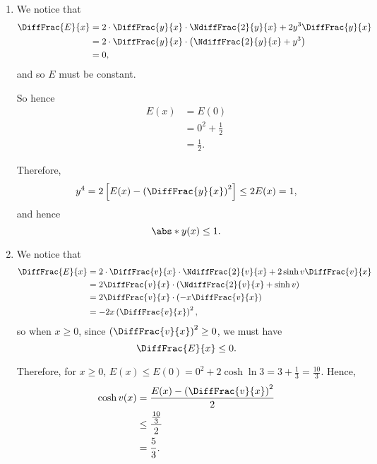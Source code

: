 \Question{\currfilebase}

\begin{enumerate}
    \item We notice that
          \begin{align*}
              \DiffFrac{E}{x} & = 2 \cdot \DiffFrac{y}{x} \cdot \NdiffFrac{2}{y}{x} + 2 y^3 \DiffFrac{y}{x} \\
                              & = 2 \cdot \DiffFrac{y}{x} \cdot \left(\NdiffFrac{2}{y}{x} + y^3\right)      \\
                              & = 0,
          \end{align*}
          and so \(E\) must be constant.

          So hence
          \begin{align*}
              E(x) & = E(0)              \\
                   & = 0^2 + \frac{1}{2} \\
                   & = \frac{1}{2}.
          \end{align*}

          Therefore,
          \[
              y^4 = 2\left[E(x) - \left(\DiffFrac{y}{x}\right)^2\right] \leq 2 E(x) = 1,
          \]
          and hence
          \[
              \abs*{y(x)} \leq 1.
          \]

    \item We notice that
          \begin{align*}
              \DiffFrac{E}{x} & = 2 \cdot \DiffFrac{v}{x} \cdot \NdiffFrac{2}{v}{x} + 2 \sinh v \DiffFrac{v}{x} \\
                              & = 2 \DiffFrac{v}{x} \cdot \left(\NdiffFrac{2}{v}{x} + \sinh v\right)            \\
                              & = 2 \DiffFrac{v}{x} \cdot \left(-x \DiffFrac{v}{x}\right)                       \\
                              & = -2x \left(\DiffFrac{v}{x}\right)^2,
          \end{align*}
          so when \(x \geq 0\), since \(\left(\DiffFrac{v}{x}\right)^2 \geq 0\), we must have
          \[
              \DiffFrac{E}{x} \leq 0.
          \]

          Therefore, for \(x \geq 0\), \(E(x) \leq E(0) = 0^2 + 2 \cosh \ln 3 = 3 + \frac{1}{3} = \frac{10}{3}\). Hence,
          \begin{align*}
              \cosh v(x) & = \frac{E(x) - \left(\DiffFrac{v}{x}\right)^2}{2} \\
                         & \leq \frac{\frac{10}{3}}{2}                       \\
                         & = \frac{5}{3}.
          \end{align*}


\end{enumerate}
